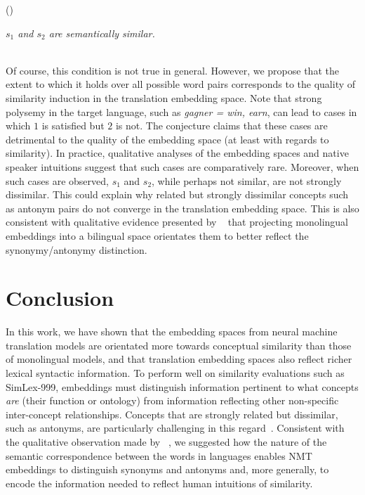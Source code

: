 \documentclass{article} %
\newcounter{quotecount}
\newcommand{\MyQuote}[1]{\vspace{0.4cm}\addtocounter{quotecount}{1}%
     (\arabic{quotecount})\hspace*{1cm}\parbox{12cm}{\em #1}\\[0.4cm]}
\begin{document}
\MyQuote{\emph{\(s_1\) and \(s_2\) are semantically similar.}}

Of course, this condition is not true in general. However, we propose that the extent to which it holds over all possible word pairs corresponds to the quality of similarity induction in the translation embedding space. Note that strong polysemy in the target language, such as \emph{gagner = win, earn}, can lead to cases in which \(1\) is satisfied but \(2\) is not. The conjecture claims that these cases are detrimental to the quality of the embedding space (at least with regards to similarity). In practice, qualitative analyses of the embedding spaces and native speaker intuitions suggest that such cases are comparatively rare. Moreover, when such cases are observed, \(s_1\) and \(s_2\), while perhaps not similar, are not strongly dissimilar. This could explain why related but strongly dissimilar concepts such as antonym pairs do not converge in the translation embedding space. This is also consistent with qualitative evidence presented by ~\citep{faruqui2014improving} that projecting monolingual embeddings into a bilingual space orientates them to better reflect the synonymy/antonymy distinction.
    

\section{Conclusion}

In this work, we have shown that the embedding spaces from neural machine translation models are orientated more towards conceptual similarity than those of monolingual models, and that translation embedding spaces also reflect richer lexical syntactic information. To perform well on similarity evaluations such as SimLex-999, embeddings must distinguish information pertinent to what concepts \emph{are} (their function or ontology) from information reflecting other non-specific inter-concept relationships. Concepts that are strongly related but dissimilar, such as antonyms, are particularly challenging in this regard~\citep{hill2014simlex}. Consistent with the qualitative observation made by ~\cite{faruqui2014improving}, we suggested how the nature of the semantic correspondence between the words in languages enables NMT embeddings to distinguish synonyms and antonyms and, more generally, to encode the information needed to reflect human intuitions of similarity.   
\end{document}
